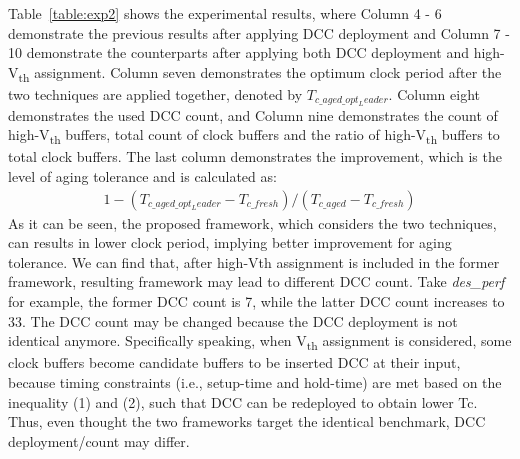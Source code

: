 Table~\ref{table:exp2} shows the experimental results, where Column 4 - 6 demonstrate the previous results after applying DCC deployment  and Column 7 - 10 demonstrate the counterparts after applying both DCC deployment and high-V\textsubscript{th} assignment. Column seven demonstrates the optimum clock period after the two techniques are applied together, denoted by $T_{c\_aged\_opt_Leader}$. Column eight demonstrates the used DCC count, and Column nine demonstrates the count of high-V\textsubscript{th} buffers, total count of clock buffers and the ratio of high-V\textsubscript{th} buffers to total clock buffers. The last column demonstrates the improvement, which is the level of aging tolerance and is calculated as:
\begin{gather*}
1 - (T_{c\_aged\_opt_Leader} - T_{c\_fresh}) / (T_{c\_aged} - T_{c\_fresh})
\end{gather*}
As it can be seen, the proposed framework, which considers the two techniques, can results in lower clock period, implying better improvement for aging tolerance. We can find that, after high-Vth assignment is included in the former framework, resulting framework may lead to different DCC count. Take \textit{des\_perf} for example, the former DCC count is 7, while the latter DCC count increases to 33. The DCC count may be changed because the DCC deployment is not identical anymore. Specifically speaking, when V\textsubscript{th} assignment is considered, some clock buffers become candidate buffers to be inserted DCC at their input, because timing constraints (i.e., setup-time and hold-time) are met based on the inequality (1) and (2), such that DCC can be redeployed to obtain lower Tc. Thus, even thought the two frameworks target the identical benchmark, DCC deployment/count may differ.

